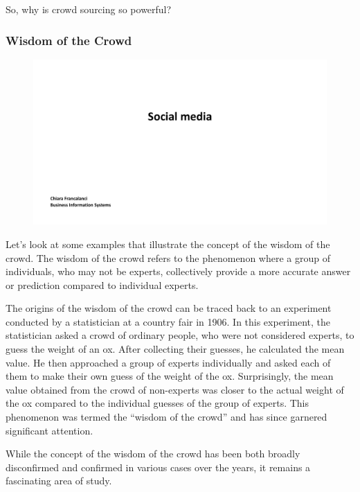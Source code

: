 So, why is crowd sourcing so powerful?

\subsubsection{Wisdom of the Crowd}\label{wisdom-of-the-crowd}

\begin{figure}[!h]
    \centering
    \includegraphics[page=7, trim = 1.5cm 4cm 2cm 4.5cm, clip, width=\textwidth]{images/04 - Social_Media.pdf}
\end{figure}

Let's look at some examples that illustrate the concept of the wisdom of
the crowd. The wisdom of the crowd refers to the phenomenon where a
group of individuals, who may not be experts, collectively provide a
more accurate answer or prediction compared to individual experts.

The origins of the wisdom of the crowd can be traced back to an
experiment conducted by a statistician at a country fair in 1906. In
this experiment, the statistician asked a crowd of ordinary people, who
were not considered experts, to guess the weight of an ox. After
collecting their guesses, he calculated the mean value. He then
approached a group of experts individually and asked each of them to
make their own guess of the weight of the ox. Surprisingly, the mean
value obtained from the crowd of non-experts was closer to the actual
weight of the ox compared to the individual guesses of the group of
experts. This phenomenon was termed the ``wisdom of the crowd'' and has
since garnered significant attention.

While the concept of the wisdom of the crowd has been both broadly
disconfirmed and confirmed in various cases over the years, it remains a
fascinating area of study.

